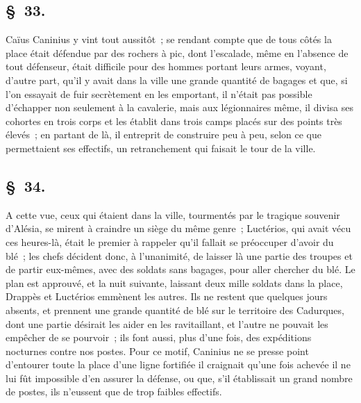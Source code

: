 \documentclass[french,twoside]{book} %
\begin{document}
\subsection[{§ 33.}]{ \textsc{§ 33.} }
\noindent Caïus Caninius y vint tout aussitôt ; se rendant compte que de tous côtés la place était défendue par des rochers à pic, dont l’escalade, même en l’absence de tout défenseur, était difficile pour des hommes portant leurs armes, voyant, d’autre part, qu’il y avait dans la ville une grande quantité de bagages et que, si l’on essayait de fuir secrètement en les emportant, il n’était pas possible d’échapper non seulement à la cavalerie, mais aux légionnaires même, il divisa ses cohortes en trois corps et les établit dans trois camps placés sur des points très élevés ; en partant de là, il entreprit de construire peu à peu, selon ce que permettaient ses effectifs, un retranchement qui faisait le tour de la ville.
\subsection[{§ 34.}]{ \textsc{§ 34.} }
\noindent A cette vue, ceux qui étaient dans la ville, tourmentés par le tragique souvenir d’Alésia, se mirent à craindre un siège du même genre ; Luctérios, qui avait vécu ces heures-là, était le premier à rappeler qu’il fallait se préoccuper d’avoir du blé ; les chefs décident donc, à l’unanimité, de laisser là une partie des troupes et de partir eux-mêmes, avec des soldats sans bagages, pour aller chercher du blé. Le plan est approuvé, et la nuit suivante, laissant deux mille soldats dans la place, Drappès et Luctérios emmènent les autres. Ils ne restent que quelques jours absents, et prennent une grande quantité de blé sur le territoire des Cadurques, dont une partie désirait les aider en les ravitaillant, et l’autre ne pouvait les empêcher de se pourvoir ; ils font aussi, plus d’une fois, des expéditions nocturnes contre nos postes. Pour ce motif, Caninius ne se presse point d’entourer toute la place d’une ligne fortifiée il craignait qu’une fois achevée il ne lui fût impossible d’en assurer la défense, ou que, s’il établissait un grand nombre de postes, ils n’eussent que de trop faibles effectifs.
\end{document}
